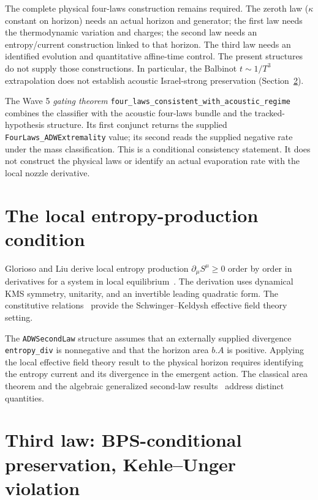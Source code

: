 \documentclass[prd,aps,twocolumn,floatfix,nofootinbib,superscriptaddress]{revtex4-2}
\begin{document}
The complete physical four-laws construction remains required.
The zeroth law ($\kappa$ constant on horizon) needs an actual horizon
and generator; the first law needs the thermodynamic variation and
charges; the second law needs an entropy/current construction linked
to that horizon. The third law needs an identified evolution and
quantitative affine-time control. The present structures do not supply
those constructions. In particular, the Balbinot $t \sim 1/T^3$
extrapolation does not establish acoustic Israel-strong preservation
(Section~\ref{sec:third}).

The Wave 5 \emph{gating theorem}
\texttt{four\_laws\_consistent\_with\_acoustic\_regime} combines the
classifier with the acoustic four-laws bundle and the
tracked-hypothesis structure. Its first conjunct returns the supplied
\texttt{FourLaws\_ADWExtremality} value; its second reads the supplied
negative rate under the mass classification. This is a conditional
consistency statement. It does not construct the physical laws or
identify an actual evaporation rate with the local nozzle derivative.

\section{The local entropy-production condition}
\label{sec:sk-second}

Glorioso and Liu derive local entropy production
$\partial_\mu S^\mu \geq 0$ order by order in derivatives for a system
in local equilibrium~\cite[Sec.~III.B, Eq.~(3.36)]{GloriosoLiu2018}.
The derivation uses dynamical KMS symmetry, unitarity, and an invertible
leading quadratic form. The constitutive
relations~\cite{CrossleyGloriosoLiu2017,GloriosoCrossleyLiu2017}
provide the Schwinger--Keldysh effective field theory setting.

The \texttt{ADWSecondLaw} structure assumes that an externally
supplied divergence \texttt{entropy\_div} is nonnegative and that
the horizon area $b.A$ is positive. Applying the local
effective field theory result to the physical horizon requires
identifying the entropy current and its divergence in the emergent
action. The classical area theorem and the algebraic generalized
second-law results~\cite{FaulknerSperanza2024,Kirklin2024GSLAllOrders}
address distinct quantities.

\section{Third law: BPS-conditional preservation, Kehle--Unger violation}
\label{sec:third}
\end{document}
